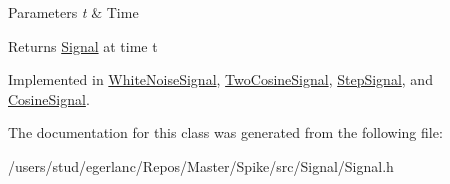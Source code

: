\begin{DoxyParams}{Parameters}
{\em t} & Time \\
\hline
\end{DoxyParams}
\begin{DoxyReturn}{Returns}
\hyperlink{classSignal}{Signal} at time t 
\end{DoxyReturn}


Implemented in \hyperlink{classWhiteNoiseSignal_a99ec1e0c59f5ded7623ffbcaa5318238}{White\+Noise\+Signal}, \hyperlink{classTwoCosineSignal_a1129875198d637d80db6f083a207a3ba}{Two\+Cosine\+Signal}, \hyperlink{classStepSignal_a04b7f029bb2b53c9b63003b0d6b4360a}{Step\+Signal}, and \hyperlink{classCosineSignal_a541f39de155f6a92162882ce102480bd}{Cosine\+Signal}.



The documentation for this class was generated from the following file\+:\begin{DoxyCompactItemize}
\item 
/users/stud/egerlanc/\+Repos/\+Master/\+Spike/src/\+Signal/Signal.\+h\end{DoxyCompactItemize}
